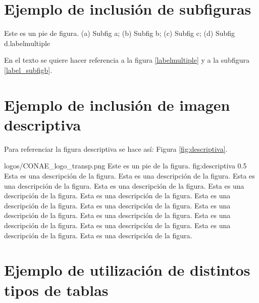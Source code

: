 \documentclass{GVT_CONAE_Class}
\begin{document}
\section{Ejemplo de inclusión de subfiguras}


\begin{imagenmultiple}{Este es un pie de figura. (a) Subfig a; (b) Subfig b; (c) Subfig c; (d) Subfig d.}{labelmultiple}
     \\ %
\end{imagenmultiple}

En el texto se quiere hacer referencia a la figura \ref{labelmultiple} y a la subfigura \ref{label_subfigb}.

\section{Ejemplo de inclusión de imagen descriptiva}

Para referenciar la figura descriptiva se hace así: Figura \ref{fig:descriptiva}.

{logos/CONAE_logo_transp.png} %
{Este es un pie de la figura.} %
{fig:descriptiva} %
{0.5} %
{Esta es una descripción de la figura. Esta es una descripción de la figura. Esta es una descripción de la figura. Esta es una descripción de la figura. Esta es una descripción de la figura. Esta es una descripción de la figura. Esta es una descripción de la figura. Esta es una descripción de la figura. Esta es una descripción de la figura. Esta es una descripción de la figura. Esta es una descripción de la figura. Esta es una descripción de la figura. Esta es una descripción de la figura. Esta es una descripción de la figura.} %


\section{Ejemplo de utilización de distintos tipos de tablas}
\end{document}
